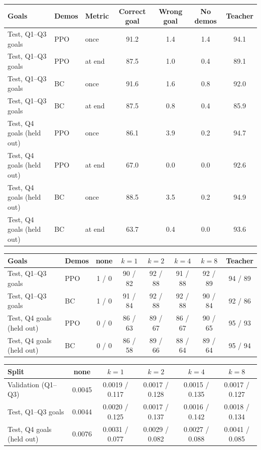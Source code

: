 \begin{tabular}{lllcccc}
\toprule
Goals & Demos & Metric & Correct goal & Wrong goal & No demos & Teacher \\
\midrule
Test, Q1--Q3 goals & PPO & once & 91.2 & 1.4 & 1.4 & 94.1 \\
Test, Q1--Q3 goals & PPO & at end & 87.5 & 1.0 & 0.4 & 89.1 \\
Test, Q1--Q3 goals & BC & once & 91.6 & 1.6 & 0.8 & 92.0 \\
Test, Q1--Q3 goals & BC & at end & 87.5 & 0.8 & 0.4 & 85.9 \\
\midrule
Test, Q4 goals (held out) & PPO & once & 86.1 & 3.9 & 0.2 & 94.7 \\
Test, Q4 goals (held out) & PPO & at end & 67.0 & 0.0 & 0.0 & 92.6 \\
Test, Q4 goals (held out) & BC & once & 88.5 & 3.5 & 0.2 & 94.9 \\
Test, Q4 goals (held out) & BC & at end & 63.7 & 0.4 & 0.0 & 93.6 \\
\bottomrule
\end{tabular}

\begin{tabular}{llcccccc}
\toprule
Goals & Demos & none & $k{=}1$ & $k{=}2$ & $k{=}4$ & $k{=}8$ & Teacher \\
\midrule
Test, Q1--Q3 goals & PPO & 1 / 0 & 90 / 82 & 92 / 88 & 91 / 88 & 92 / 89 & 94 / 89 \\
Test, Q1--Q3 goals & BC & 1 / 0 & 91 / 84 & 92 / 88 & 92 / 88 & 90 / 84 & 92 / 86 \\
Test, Q4 goals (held out) & PPO & 0 / 0 & 86 / 63 & 89 / 67 & 86 / 67 & 90 / 65 & 95 / 93 \\
Test, Q4 goals (held out) & BC & 0 / 0 & 86 / 58 & 89 / 66 & 88 / 64 & 89 / 64 & 95 / 94 \\
\bottomrule
\end{tabular}

\begin{tabular}{lccccc}
\toprule
Split & none & $k{=}1$ & $k{=}2$ & $k{=}4$ & $k{=}8$ \\
\midrule
Validation (Q1--Q3) & 0.0045 & 0.0019 / 0.117 & 0.0017 / 0.128 & 0.0015 / 0.135 & 0.0017 / 0.127 \\
Test, Q1--Q3 goals & 0.0044 & 0.0020 / 0.125 & 0.0017 / 0.137 & 0.0016 / 0.142 & 0.0018 / 0.134 \\
Test, Q4 goals (held out) & 0.0076 & 0.0031 / 0.077 & 0.0029 / 0.082 & 0.0027 / 0.088 & 0.0041 / 0.085 \\
\bottomrule
\end{tabular}

